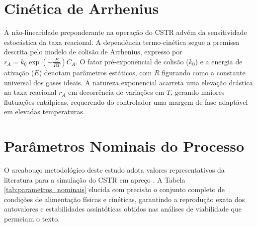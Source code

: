 \section{Cinética de Arrhenius}
\label{sec:cinetica_arrhenius}

A não-linearidade preponderante na operação do CSTR advém da sensitividade estocástica da taxa reacional. A dependência termo-cinética segue a premissa descrita pelo modelo de colisão de Arrhenius, expresso por $r_A = k_0 \exp\left(-\frac{E}{RT}\right) C_A$. O fator pré-exponencial de colisão ($k_0$) e a energia de ativação ($E$) denotam parâmetros estáticos, com $R$ figurando como a constante universal dos gases ideais. A natureza exponencial acarreta uma elevação drástica na taxa reacional $r_A$ em decorrência de variações em $T$, gerando maiores flutuações entálpicas, requerendo do controlador uma margem de fase adaptável em elevadas temperaturas.

\section{Parâmetros Nominais do Processo}
\label{sec:parametros_nominais}

O arcabouço metodológico deste estudo adota valores representativos da literatura para a simulação do CSTR em apreço \cite{Bequette2003}. A Tabela \ref{tab:parametros_nominais} elucida com precisão o conjunto completo de condições de alimentação físicas e cinéticas, garantindo a reprodução exata dos autovalores e estabilidades assintóticas obtidos nas análises de viabilidade que permeiam o texto.

